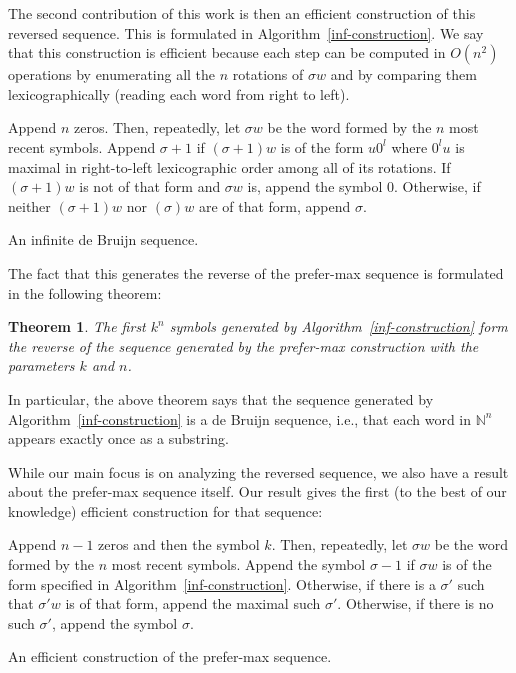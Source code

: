\documentclass{article}
\newtheorem{theorem}{Theorem}
\theoremstyle{definition}
\newcommand{\N}{{\mathbb{N}}}
\begin{document}
The second contribution of this work is then an efficient construction of this reversed sequence. This is formulated in Algorithm~\ref{inf-construction}. We say that this construction is efficient because each step can be computed in $O(n^2)$ operations by enumerating all the $n$ rotations of $\sigma w$ and by comparing them lexicographically (reading each word from right to left).


\begin{algorithm}[!h]
	Append $n$ zeros. Then, repeatedly, let $\sigma w$ be the word formed by the $n$ most recent symbols. Append $\sigma+1$ if $(\sigma+1)w$ is of the form $u0^l$ where $0^lu$ is maximal in right-to-left lexicographic order among all of its rotations. If $(\sigma+1)w$ is not of that form and $\sigma w$ is, append the symbol $0$. Otherwise, if neither $(\sigma+1)w$ nor $(\sigma)w$ are of that form, append $\sigma$.
	\caption{An infinite de Bruijn sequence.}
	\label{inf-construction}
\end{algorithm}

The fact that this generates the reverse of the prefer-max sequence is formulated in the following theorem:
 
\begin{theorem} 
The first $k^n$ symbols generated by Algorithm~\ref{inf-construction} form the reverse of the sequence generated by the prefer-max construction with the parameters $k$ and $n$.	
\end{theorem} 

In particular, the above theorem says that the sequence generated by Algorithm~\ref{inf-construction} is a de Bruijn sequence, i.e., that each word in $\N^n$ appears exactly once as a substring.

While our main focus is on analyzing the reversed sequence, we also have a result about the prefer-max sequence itself. Our result gives the first (to the best of our knowledge) efficient construction for that sequence:

\begin{algorithm}
	Append $n-1$ zeros and then the symbol $k$. Then, repeatedly, let $\sigma w$ be the word formed by the $n$ most recent symbols. Append the symbol $\sigma-1$  if $\sigma w$  is of the form specified in Algorithm~\ref{inf-construction}. Otherwise, if there is a  $\sigma'$ such that $\sigma'w$ is of that form, append the maximal such $\sigma'$. Otherwise, if there is no such $\sigma'$, append the symbol $\sigma$.
		
	\caption{An efficient construction of the prefer-max sequence.}
	\label{efficient-pref-max}
\end{algorithm}
\end{document}
